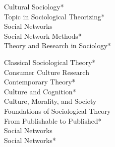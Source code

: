 \begin{multicols}{2}
[]
\noindent
Cultural Sociology\textcolor{uclablue}{*} \\
Topic in Sociological Theorizing\textcolor{uclablue}{*}  \\
Social Networks \\
Social Network Methods\textcolor{uclablue}{*} \\
Theory and Research in Sociology\textcolor{uclablue}{*} \\
\end{multicols}  
\medskip
\begin{multicols}{2}
[]
\noindent
Classical Sociological Theory\textcolor{uclablue}{*}   \\
Consumer Culture Research  \\
Contemporary Theory\textcolor{uclablue}{*}  \\
Culture and Cognition\textcolor{uclablue}{*}  \\
Culture, Morality, and Society  \\
Foundations of Sociological Theory  \\
From Publishable to Published\textcolor{uclablue}{*}   \\
Social Networks  \\
Social Networks\textcolor{uclablue}{*}   
\end{multicols} 